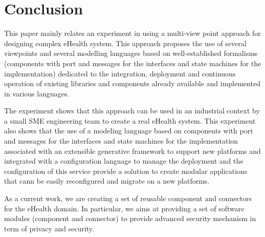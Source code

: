 \section{Conclusion}

This paper mainly relates an experiment in using a multi-view point approach for designing complex eHealth system. This approach proposes the use of several viewpoints and several modelling languages based on well-established formalisms (components with port and messages for the interfaces and state machines for the implementation)  dedicated to the integration, deployment and continuous operation of existing libraries and components already available and implemented in various languages. 

The experiment shows that this approach can be used in an industrial context by a small SME engineering team to create a real eHealth system. This experiment also shows that the use of a modeling language based on components with port and messages for the interfaces and state machines for the implementation associated with an extensible generative framework to support new platforms and integrated with a configuration language to manage the deployment and the configuration of this service provide a solution to create modular applications that cann be easily reconfigured and migrate on a new platforms. 

As a current work, we are creating a set of reusable component and connectors for the eHealth domain. In particular, we aims at providing a set of software modules (component and connector)  to provide advanced security mechanism in term of privacy and security. 